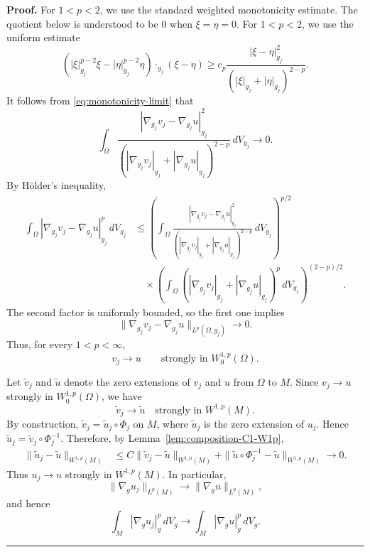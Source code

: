 \documentclass[10pt,a4paper]{amsart}
\newenvironment{proof}[1][Proof]{\textbf{#1.} }{\hfill\rule{0.5em}{0.5em}}
\begin{document}
\begin{proof}
For $1<p<2$, we use the standard weighted monotonicity estimate.
The quotient below is understood to be $0$ when $\xi=\eta=0$.
For $1<p<2$, we use the uniform estimate
\[
\left(
|\xi|_{g_j}^{p-2}\xi-|\eta|_{g_j}^{p-2}\eta
\right)\cdot_{g_j}(\xi-\eta)
\ge c_p
\frac{|\xi-\eta|_{g_j}^2}
{(|\xi|_{g_j}+|\eta|_{g_j})^{2-p}}.
\]
It follows from \eqref{eq:monotonicity-limit} that
\[
\int_\Omega
\frac{|\nabla_{g_j}v_j-\nabla_{g_j}u|_{g_j}^2}
{(|\nabla_{g_j}v_j|_{g_j}+|\nabla_{g_j}u|_{g_j})^{2-p}}
\,dV_{g_j}\longrightarrow0.
\]
By H\"older's inequality,
\begin{align*}
\int_\Omega
|\nabla_{g_j}v_j-\nabla_{g_j}u|_{g_j}^p\,dV_{g_j}
&\leq
\left(
\int_\Omega
\frac{|\nabla_{g_j}v_j-\nabla_{g_j}u|_{g_j}^2}
{(|\nabla_{g_j}v_j|_{g_j}+|\nabla_{g_j}u|_{g_j})^{2-p}}
\,dV_{g_j}
\right)^{p/2}
\\
&\quad\times
\left(
\int_\Omega
(|\nabla_{g_j}v_j|_{g_j}+|\nabla_{g_j}u|_{g_j})^p
\,dV_{g_j}
\right)^{(2-p)/2}.
\end{align*}
The second factor is uniformly bounded, so the first one implies
\[
\|\nabla_{g_j}v_j-\nabla_{g_j}u\|_{L^p(\Omega,g_j)}\longrightarrow0.
\]
Thus, for every $1<p<\infty$,
\[
v_j\longrightarrow u
\qquad\text{strongly in }W_0^{1,p}(\Omega).
\]

Let $\widetilde v_j$ and $\widetilde u$ denote the zero extensions of
$v_j$ and $u$ from $\Omega$ to $M$. Since
$v_j\to u$ strongly in $W_0^{1,p}(\Omega)$, we have
\[
\widetilde v_j\to\widetilde u\quad\text{strongly in }W^{1,p}(M).
\]
By construction, $\widetilde v_j=\widetilde u_j\circ\Phi_j$ on $M$,
where $\widetilde u_j$ is the zero extension of $u_j$. Hence
$\widetilde u_j=\widetilde v_j\circ\Phi_j^{-1}$. Therefore, by
Lemma~\ref{lem:composition-C1-W1p},
\begin{align*}
\|\widetilde u_j-\widetilde u\|_{W^{1,p}(M)}
&\le C\|\widetilde v_j-\widetilde u\|_{W^{1,p}(M)}
+\|\widetilde u\circ\Phi_j^{-1}-\widetilde u\|_{W^{1,p}(M)}
\longrightarrow0.
\end{align*}
Thus $u_j\to u$ strongly in $W^{1,p}(M)$.
In particular,
\[
\|\nabla_g u_j\|_{L^p(M)}
\longrightarrow
\|\nabla_g u\|_{L^p(M)},
\]
and hence
\[
\int_M|\nabla_g u_j|_g^p\,dV_g
\longrightarrow
\int_M|\nabla_g u|_g^p\,dV_g.
\]

\end{proof}
\end{document}
